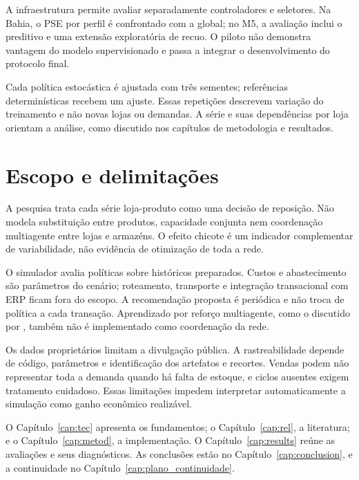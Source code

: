 A infraestrutura permite avaliar separadamente controladores e seletores. Na Bahia, o PSE por perfil é confrontado com a global; no M5, a avaliação inclui o preditivo e uma extensão exploratória de recuo. O piloto não demonstra vantagem do modelo supervisionado e passa a integrar o desenvolvimento do protocolo final.

Cada política estocástica é ajustada com três sementes; referências determinísticas recebem um ajuste. Essas repetições descrevem variação do treinamento e não novas lojas ou demandas. A série e suas dependências por loja orientam a análise, como discutido nos capítulos de metodologia e resultados.

\section{Escopo e delimitações}
\label{sec:delimitacoes}

A pesquisa trata cada série loja-produto como uma decisão de reposição. Não modela substituição entre produtos, capacidade conjunta nem coordenação multiagente entre lojas e armazéns. O efeito chicote é um indicador complementar de variabilidade, não evidência de otimização de toda a rede.

O simulador avalia políticas sobre históricos preparados. Custos e abastecimento são parâmetros do cenário; roteamento, transporte e integração transacional com ERP ficam fora do escopo. A recomendação proposta é periódica e não troca de política a cada transação. Aprendizado por reforço multiagente, como o discutido por \citet{Liu2024HAPPO}, também não é implementado como coordenação da rede.

Os dados proprietários limitam a divulgação pública. A rastreabilidade depende de código, parâmetros e identificação dos artefatos e recortes. Vendas podem não representar toda a demanda quando há falta de estoque, e ciclos ausentes exigem tratamento cuidadoso. Essas limitações impedem interpretar automaticamente a simulação como ganho econômico realizável.

O Capítulo~\ref{cap:tec} apresenta os fundamentos; o Capítulo~\ref{cap:rel}, a literatura; e o Capítulo~\ref{cap:metod}, a implementação. O Capítulo~\ref{cap:results} reúne as avaliações e seus diagnósticos. As conclusões estão no Capítulo~\ref{cap:conclusion}, e a continuidade no Capítulo~\ref{cap:plano_continuidade}.

\newpage\lhead{\rightmark}
